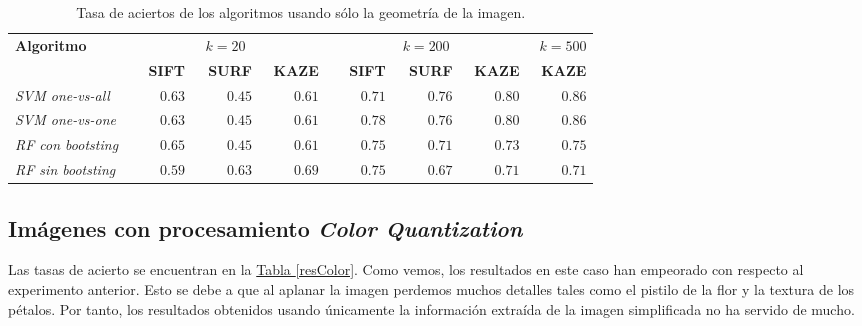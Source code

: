 \documentclass[paper=a4, fontsize=11pt]{article} %
\numberwithin{equation}{section} %
\numberwithin{figure}{section} %
\numberwithin{table}{section} %
\begin{document}
\begin{table}[H]
  \begin{tabular}{|l|r|r|r||r|r|r|r|}
  \hline
    \multirow{2}{*}{\textbf{Algoritmo}} & \multicolumn{3}{c||}{$k=20$} & \multicolumn{3}{c|}{$k=200$} & \textbf{$k=500$} \\
    \cline{2-8}
    & \textbf{SIFT} & \textbf{SURF} & \textbf{KAZE} & \textbf{SIFT} & \textbf{SURF} & \textbf{KAZE} & \textbf{KAZE} \\
    \hline
    \textit{SVM one-vs-all} & $\qquad 0.63$ & $\qquad 0.45$ & $\qquad 0.61$ & $\qquad 0.71$ & $\qquad 0.76$ & $\qquad 0.80$ & $\qquad 0.86$ \\
    \textit{SVM one-vs-one} & $\qquad 0.63$ & $\qquad 0.45$ & $\qquad 0.61$ & $\qquad 0.78$ & $\qquad 0.76$ & $\qquad 0.80$ & $\qquad 0.86$ \\
    \textit{RF con bootsting} & $\qquad 0.65$ & $\qquad 0.45$ & $\qquad 0.61$ & $\qquad 0.75$ & $\qquad 0.71$ & $\qquad 0.73$ & $\qquad 0.75$ \\
    \textit{RF sin bootsting} & $\qquad 0.59$ & $\qquad 0.63$ & $\qquad 0.69$ & $\qquad 0.75$ & $\qquad 0.67$ & $\qquad 0.71$ & $\qquad 0.71$ \\
    \hline
  \end{tabular}
  \label{resSHAPE}
  \caption{Tasa de aciertos de los algoritmos usando sólo la geometría de la imagen.}
\end{table}

\subsection{Imágenes con procesamiento \textit{Color Quantization}}

Las tasas de acierto se encuentran en la \hyperref[resColor]{Tabla \ref*{resColor}}. Como vemos, los resultados en este caso han empeorado con respecto al experimento anterior. Esto se debe a que al aplanar la imagen perdemos muchos detalles tales como el pistilo de la flor y la textura de los pétalos.  Por tanto, los resultados obtenidos usando únicamente la información extraída de la imagen simplificada no ha servido de mucho.
\end{document}
